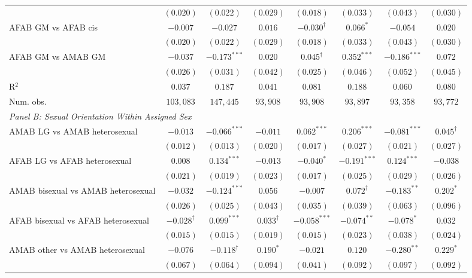 \begin{table}[htpb!]
{\begin{tabular}{l c c c c c c c}
 & $(0.020)$ & $(0.022)$ & $(0.029)$ & $(0.018)$ & $(0.033)$ & $(0.043)$ & $(0.030)$ \\
AFAB GM vs AFAB cis & $-0.007$ & $-0.027$ & $0.016$ & $-0.030^{\dagger}$ & $0.066^{*}$ & $-0.054$ & $0.020$ \\
 & $(0.020)$ & $(0.022)$ & $(0.029)$ & $(0.018)$ & $(0.033)$ & $(0.043)$ & $(0.030)$ \\
AFAB GM vs AMAB GM & $-0.037$ & $-0.173^{***}$ & $0.020$ & $0.045^{\dagger}$ & $0.352^{***}$ & $-0.186^{***}$ & $0.072$ \\
 & $(0.026)$ & $(0.031)$ & $(0.042)$ & $(0.025)$ & $(0.046)$ & $(0.052)$ & $(0.045)$ \\
\hline
R$^2$ & $0.037$ & $0.187$ & $0.041$ & $0.081$ & $0.188$ & $0.060$ & $0.080$ \\
Num. obs. & $103,083$ & $147,445$ & $93,908$ & $93,908$ & $93,897$ & $93,358$ & $93,772$ \\
\hline
\multicolumn{8}{l}{\textit{Panel B: Sexual Orientation Within Assigned Sex}} \\
AMAB LG vs AMAB heterosexual & $-0.013$ & $-0.066^{***}$ & $-0.011$ & $0.062^{***}$ & $0.206^{***}$ & $-0.081^{***}$ & $0.045^{\dagger}$ \\
 & $(0.012)$ & $(0.013)$ & $(0.020)$ & $(0.017)$ & $(0.027)$ & $(0.021)$ & $(0.027)$ \\
AFAB LG vs AFAB heterosexual & $0.008$ & $0.134^{***}$ & $-0.013$ & $-0.040^{*}$ & $-0.191^{***}$ & $0.124^{***}$ & $-0.038$ \\
 & $(0.021)$ & $(0.019)$ & $(0.023)$ & $(0.017)$ & $(0.025)$ & $(0.029)$ & $(0.026)$ \\
AMAB bisexual vs AMAB heterosexual & $-0.032$ & $-0.124^{***}$ & $0.056$ & $-0.007$ & $0.072^{\dagger}$ & $-0.183^{**}$ & $0.202^{*}$ \\
 & $(0.026)$ & $(0.025)$ & $(0.043)$ & $(0.035)$ & $(0.039)$ & $(0.063)$ & $(0.096)$ \\
AFAB bisexual vs AFAB heterosexual & $-0.028^{\dagger}$ & $0.099^{***}$ & $0.033^{\dagger}$ & $-0.058^{***}$ & $-0.074^{**}$ & $-0.078^{*}$ & $0.032$ \\
 & $(0.015)$ & $(0.015)$ & $(0.019)$ & $(0.015)$ & $(0.023)$ & $(0.038)$ & $(0.024)$ \\
AMAB other vs AMAB heterosexual & $-0.076$ & $-0.118^{\dagger}$ & $0.190^{*}$ & $-0.021$ & $0.120$ & $-0.280^{**}$ & $0.229^{*}$ \\
 & $(0.067)$ & $(0.064)$ & $(0.094)$ & $(0.041)$ & $(0.092)$ & $(0.097)$ & $(0.092)$ \\

\end{tabular}}
\end{table}
